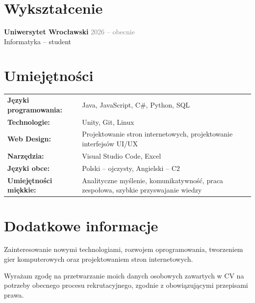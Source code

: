 \documentclass[10pt,a4paper]{article}
\begin{document}
\section*{Wykształcenie}

\textbf{Uniwersytet Wrocławski}
\hfill \textcolor{graytext}{2026 -- obecnie}\\
Informatyka -- student

\section*{Umiejętności}

\begin{tabularx}{\textwidth}{@{}l X@{}}
\textbf{Języki programowania:} &
Java, JavaScript, C\#, Python, SQL \\[3pt]

\textbf{Technologie:} &
Unity, Git, Linux \\[3pt]

\textbf{Web Design:} &
Projektowanie stron internetowych,
projektowanie interfejsów UI/UX \\[3pt]

\textbf{Narzędzia:} &
Visual Studio Code, Excel \\[3pt]

\textbf{Języki obce:} &
Polski -- ojczysty, Angielski -- C2 \\[3pt]

\textbf{Umiejętności miękkie:} &
Analityczne myślenie, komunikatywność,
praca zespołowa, szybkie przyswajanie wiedzy
\end{tabularx}

\section*{Dodatkowe informacje}

Zainteresowanie nowymi technologiami, rozwojem
oprogramowania, tworzeniem gier komputerowych
oraz projektowaniem stron internetowych.

\vfill

{\footnotesize\color{graytext}
Wyrażam zgodę na przetwarzanie moich danych osobowych
zawartych w CV na potrzeby obecnego procesu rekrutacyjnego,
zgodnie z obowiązującymi przepisami prawa.
}
\end{document}
